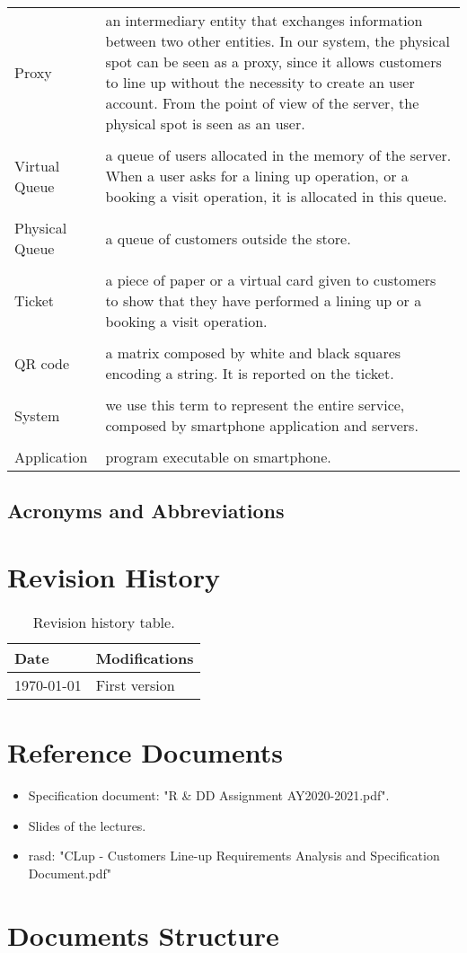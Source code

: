 \begin{tabularx}{\textwidth}{ >{\hsize=0.2\textwidth}X >{\hsize=0.8\textwidth}X}
  Proxy & an intermediary entity that exchanges information between two other entities. In our system, the physical spot can be seen as a proxy, since it allows customers to line up without the necessity to create an user account. From the point of view of the server, the physical spot is seen as an user.\\ \\
  Virtual Queue & a queue of users allocated in the memory of the server. When a user asks for a lining up operation, or a booking a visit operation, it is allocated in this queue.\\ \\
  Physical Queue & a queue of customers outside the store.\\ \\
  Ticket & a piece of paper or a virtual card given to customers to show that they have performed a lining up or a booking a visit operation.\\ \\
  QR code & a matrix composed by white and black squares encoding a string. It is reported on the ticket.\\ \\
  System & we use this term to represent the entire service, composed by smartphone application and servers.\\ \\
  Application & program executable on smartphone.
\end{tabularx}

\subsection{Acronyms and Abbreviations}
\printglossary

\section{Revision History}

\begin{table}[H]
\centering
\begin{tabular}{ m{} | m{} } 
	 \textbf{Date} & \textbf{Modifications} \\
	\hline
	\today & First version \\
\end{tabular}
\caption{Revision history table.}
\label{table:revisionHistory}
\end{table}

\section{Reference Documents}

\begin{itemize}
	\item Specification document: "R \& DD Assignment AY2020-2021.pdf".
	\item Slides of the lectures.
	\item \gls{rasd}: "CLup - Customers Line-up Requirements Analysis and Specification Document.pdf"
\end{itemize}

\section{Documents Structure}